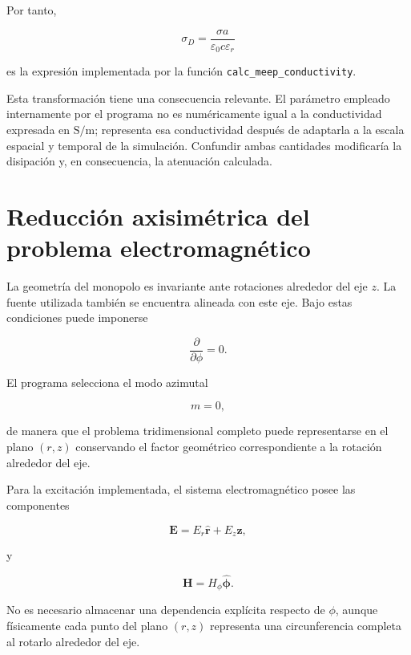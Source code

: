 Por tanto,

\begin{equation}
\boxed{
\sigma_D
=
\frac{\sigma a}
{\varepsilon_0 c\varepsilon_r}
}
\label{eq:sigma_meep}
\end{equation}

es la expresión implementada por la función \texttt{calc\_meep\_conductivity}.

Esta transformación tiene una consecuencia relevante. El parámetro empleado internamente por el programa no es numéricamente igual a la conductividad expresada en $\mathrm{S/m}$; representa esa conductividad después de adaptarla a la escala espacial y temporal de la simulación. Confundir ambas cantidades modificaría la disipación y, en consecuencia, la atenuación calculada.

\section{Reducción axisimétrica del problema electromagnético}

La geometría del monopolo es invariante ante rotaciones alrededor del eje $z$. La fuente utilizada también se encuentra alineada con este eje. Bajo estas condiciones puede imponerse

\begin{equation}
\frac{\partial}{\partial\phi}=0.
\end{equation}

El programa selecciona el modo azimutal

\begin{equation}
m=0,
\end{equation}

de manera que el problema tridimensional completo puede representarse en el plano $(r,z)$ conservando el factor geométrico correspondiente a la rotación alrededor del eje.

Para la excitación implementada, el sistema electromagnético posee las componentes

\begin{equation}
\mathbf{E}
=
E_r\hat{\mathbf{r}}
+
E_z\hat{\mathbf{z}},
\end{equation}

y

\begin{equation}
\mathbf{H}
=
H_\phi\hat{\boldsymbol{\phi}}.
\end{equation}

No es necesario almacenar una dependencia explícita respecto de $\phi$, aunque físicamente cada punto del plano $(r,z)$ representa una circunferencia completa al rotarlo alrededor del eje.

